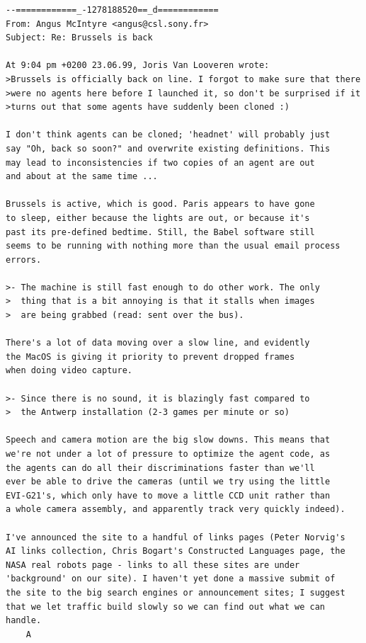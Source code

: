 \footnotesize{
\begin{verbatim}
--============_-1278188520==_d============
From: Angus McIntyre <angus@csl.sony.fr>
Subject: Re: Brussels is back

At 9:04 pm +0200 23.06.99, Joris Van Looveren wrote:
>Brussels is officially back on line. I forgot to make sure that there
>were no agents here before I launched it, so don't be surprised if it
>turns out that some agents have suddenly been cloned :)

I don't think agents can be cloned; 'headnet' will probably just 
say "Oh, back so soon?" and overwrite existing definitions. This 
may lead to inconsistencies if two copies of an agent are out 
and about at the same time ...

Brussels is active, which is good. Paris appears to have gone 
to sleep, either because the lights are out, or because it's 
past its pre-defined bedtime. Still, the Babel software still 
seems to be running with nothing more than the usual email process errors.

>- The machine is still fast enough to do other work. The only
>  thing that is a bit annoying is that it stalls when images
>  are being grabbed (read: sent over the bus).

There's a lot of data moving over a slow line, and evidently 
the MacOS is giving it priority to prevent dropped frames 
when doing video capture.

>- Since there is no sound, it is blazingly fast compared to
>  the Antwerp installation (2-3 games per minute or so)

Speech and camera motion are the big slow downs. This means that 
we're not under a lot of pressure to optimize the agent code, as 
the agents can do all their discriminations faster than we'll 
ever be able to drive the cameras (until we try using the little 
EVI-G21's, which only have to move a little CCD unit rather than 
a whole camera assembly, and apparently track very quickly indeed).

I've announced the site to a handful of links pages (Peter Norvig's 
AI links collection, Chris Bogart's Constructed Languages page, the 
NASA real robots page - links to all these sites are under 
'background' on our site). I haven't yet done a massive submit of 
the site to the big search engines or announcement sites; I suggest 
that we let traffic build slowly so we can find out what we can handle.
	A
\end{verbatim}
}

